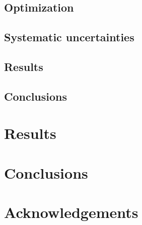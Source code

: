\documentclass[12pt, a4paper]{article}
\begin{document}
\subsection{Optimization}
\subsection{Systematic uncertainties}
\subsection{Results}

\subsection{Conclusions}
\section{Results}
\section{Conclusions}
\section{Acknowledgements}
\end{document}

